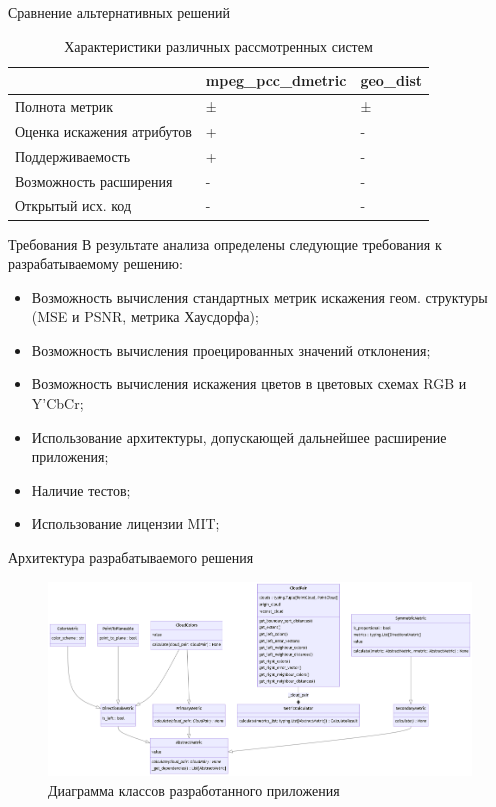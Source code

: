 \documentclass[aspectratio=169]{beamer}
\begin{document}
  \begin{frame}{Сравнение альтернативных решений}
    \begin{table}
      \begin{xltabular}{\linewidth}{|l|X|X|}
        \hline
        & mpeg\_pcc\_dmetric & geo\_dist \\
        \hline
        Полнота метрик & ± & ± \\
        \hline
        Оценка искажения атрибутов & + & - \\
        \hline
        Поддерживаемость & + & - \\
        \hline
        Возможность расширения & - & - \\
        \hline
        Открытый исх. код & - & - \\
        \hline
      \end{xltabular}
      \caption{
          Характеристики различных рассмотренных систем
      }
    \end{table}
  \end{frame}

  \begin{frame}{Требования}
    В результате анализа определены следующие требования к разрабатываемому
    решению:

    \begin{itemize}
        \item Возможность вычисления стандартных метрик искажения геом.
        структуры (MSE и PSNR, метрика Хаусдорфа);
        \item Возможность вычисления проецированных значений отклонения;
        \item Возможность вычисления искажения цветов в цветовых схемах RGB и Y'CbCr;
        \item Использование архитектуры, допускающей дальнейшее расширение
        приложения;
        \item Наличие тестов;
        \item Использование лицензии MIT;
    \end{itemize}
  \end{frame}

  \begin{frame}{Архитектура разрабатываемого решения}
    \begin{figure}[H]
        \centering
        \includegraphics[width=\linewidth]{assets/classes.png}
        \caption{Диаграмма классов разработанного приложения}
        \label{img:metric_classes}
    \end{figure}
  \end{frame}
\end{document}

